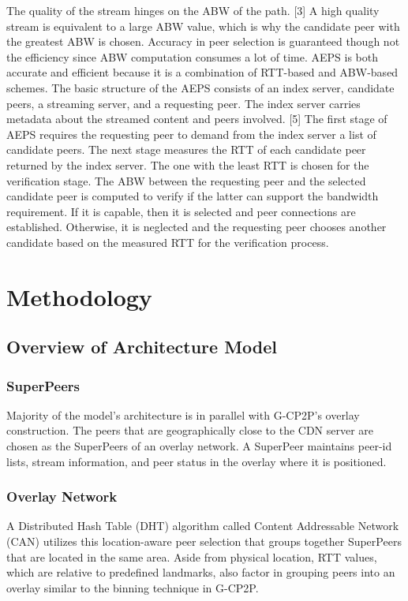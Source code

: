 \documentclass[letterpaper, twocolumn, twoside]{IEEEtran}
\begin{document}
The quality of the stream hinges on the ABW of the path. [3] A high quality stream is equivalent to a large ABW value, which is why the candidate peer with the greatest ABW is chosen. Accuracy in peer selection is guaranteed though not the efficiency since ABW computation consumes a lot of time.
AEPS is both accurate and efficient because it is a combination of RTT-based and ABW-based schemes. The basic structure of the AEPS consists of an index server, candidate peers, a streaming server, and a requesting peer. The index server carries metadata about the streamed content and peers involved. [5] The first stage of AEPS requires the requesting peer to demand from the index server a list of candidate peers. The next stage measures the RTT of each candidate peer returned by the index server. The one with the least RTT is chosen for the verification stage. The ABW between the requesting peer and the selected candidate peer is computed to verify if the latter can support the bandwidth requirement. If it is capable, then it is selected and peer connections are established. Otherwise, it is neglected and the requesting peer chooses another candidate based on the measured RTT for the verification process.

\section{Methodology}
\subsection{Overview of Architecture Model}
\subsubsection{SuperPeers}
Majority of the model’s architecture is in parallel with G-CP2P’s overlay construction. The peers that are geographically close to the CDN server are chosen as the SuperPeers of an overlay network. A SuperPeer maintains peer-id lists, stream information, and peer status in the overlay where it is positioned.
\subsubsection{Overlay Network}
A Distributed Hash Table (DHT) algorithm called Content Addressable Network (CAN) utilizes this location-aware peer selection that groups together SuperPeers that are located in the same area. Aside from physical location, RTT values, which are relative to predefined landmarks, also factor in grouping peers into an overlay similar to the binning technique in G-CP2P.
\end{document}
